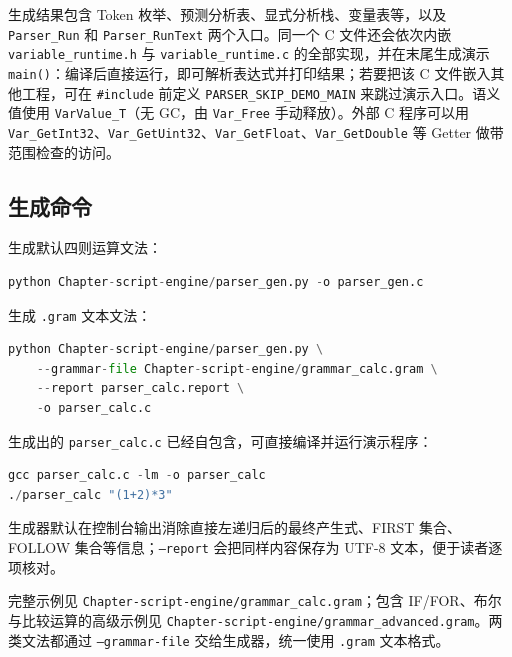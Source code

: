 生成结果包含 Token 枚举、预测分析表、显式分析栈、变量表等，以及 \texttt{Parser\_Run} 和 \texttt{Parser\_RunText} 两个入口。同一个 C 文件还会依次内嵌 \texttt{variable\_runtime.h} 与 \texttt{variable\_runtime.c} 的全部实现，并在末尾生成演示 \texttt{main()}：编译后直接运行，即可解析表达式并打印结果；若要把该 C 文件嵌入其他工程，可在 \texttt{\#include} 前定义 \texttt{PARSER\_SKIP\_DEMO\_MAIN} 来跳过演示入口。语义值使用 \texttt{VarValue\_T}（无 GC，由 \texttt{Var\_Free} 手动释放）。外部 C 程序可以用 \texttt{Var\_GetInt32}、\texttt{Var\_GetUint32}、\texttt{Var\_GetFloat}、\texttt{Var\_GetDouble} 等 Getter 做带范围检查的访问。

\subsection{生成命令}

生成默认四则运算文法：

\begin{lstlisting}[language=Python]
python Chapter-script-engine/parser_gen.py -o parser_gen.c
\end{lstlisting}

生成 \texttt{.gram} 文本文法：

\begin{lstlisting}[language=Python]
python Chapter-script-engine/parser_gen.py \
    --grammar-file Chapter-script-engine/grammar_calc.gram \
    --report parser_calc.report \
    -o parser_calc.c
\end{lstlisting}

生成出的 \texttt{parser\_calc.c} 已经自包含，可直接编译并运行演示程序：

\begin{lstlisting}[language=Python]
gcc parser_calc.c -lm -o parser_calc
./parser_calc "(1+2)*3"
\end{lstlisting}

生成器默认在控制台输出消除直接左递归后的最终产生式、FIRST 集合、FOLLOW 集合等信息；\texttt{--report} 会把同样内容保存为 UTF-8 文本，便于读者逐项核对。

完整示例见 \texttt{Chapter-script-engine/grammar\_calc.gram}；包含 IF/FOR、布尔与比较运算的高级示例见 \texttt{Chapter-script-engine/grammar\_advanced.gram}。两类文法都通过 \texttt{--grammar-file} 交给生成器，统一使用 \texttt{.gram} 文本格式。

